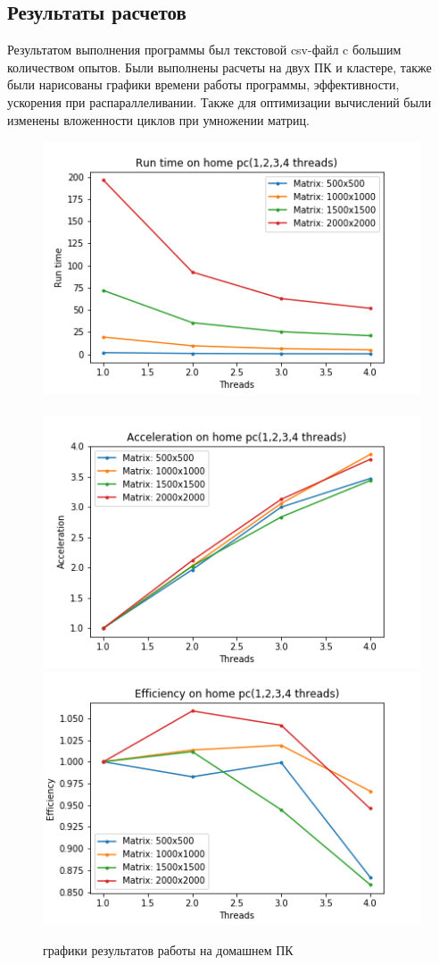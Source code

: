 \documentclass[12pt]{article}
\begin{document}
\subsection{Результаты расчетов}
Результатом выполнения программы был текстовой csv-файл c большим количеством опытов.
Были выполнены расчеты на двух ПК и кластере, также были нарисованы графики времени работы программы, эффективности, ускорения при распараллеливании. Также для оптимизации вычислений были изменены вложенности циклов при умножении матриц.\\
	\begin{figure}
		\centering
		\includegraphics[scale=0.4]{pc/RuntimeMypc.png}~
		\includegraphics[scale=0.4]{pc/AccelerationMypc.png}
		\includegraphics[scale=0.4]{pc/EfficiencyMypc.png}
		\caption{графики результатов работы на домашнем ПК}
		

\end{figure}
\end{document}
